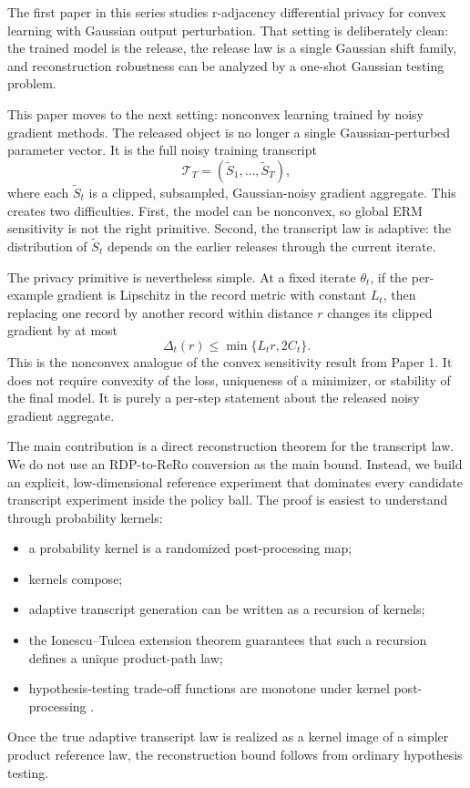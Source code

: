 \documentclass[conference,compsoc]{IEEEtran}
\newcommand{\cT}{\mathcal{T}}
\begin{document}
The first paper in this series studies r-adjacency differential privacy for convex learning with Gaussian output perturbation. That setting is deliberately clean: the trained model is the release, the release law is a single Gaussian shift family, and reconstruction robustness can be analyzed by a one-shot Gaussian testing problem.

This paper moves to the next setting: nonconvex learning trained by noisy gradient methods. The released object is no longer a single Gaussian-perturbed parameter vector. It is the full noisy training transcript
\[
\cT_T=(\widetilde S_1,\ldots,\widetilde S_T),
\]
where each $\widetilde S_t$ is a clipped, subsampled, Gaussian-noisy gradient aggregate. This creates two difficulties.
First, the model can be nonconvex, so global ERM sensitivity is not the right primitive.
Second, the transcript law is adaptive: the distribution of $\widetilde S_t$ depends on the earlier releases through the current iterate.

The privacy primitive is nevertheless simple. At a fixed iterate $\theta_t$, if the per-example gradient is Lipschitz in the record metric with constant $L_t$, then replacing one record by another record within distance $r$ changes its clipped gradient by at most
\[
\Delta_t(r)\le \min\{L_t r,2C_t\}.
\]
This is the nonconvex analogue of the convex sensitivity result from Paper 1. It does not require convexity of the loss, uniqueness of a minimizer, or stability of the final model. It is purely a per-step statement about the released noisy gradient aggregate.

The main contribution is a direct reconstruction theorem for the transcript law. We do not use an RDP-to-ReRo conversion as the main bound. Instead, we build an explicit, low-dimensional reference experiment that dominates every candidate transcript experiment inside the policy ball. The proof is easiest to understand through probability kernels:
\begin{itemize}[leftmargin=1.4em]
    \item a probability kernel is a randomized post-processing map;
    \item kernels compose;
    \item adaptive transcript generation can be written as a recursion of kernels;
    \item the Ionescu--Tulcea extension theorem guarantees that such a recursion defines a unique product-path law;
    \item hypothesis-testing trade-off functions are monotone under kernel post-processing \cite{dong2022gdp}.
\end{itemize}
Once the true adaptive transcript law is realized as a kernel image of a simpler product reference law, the reconstruction bound follows from ordinary hypothesis testing.
\end{document}
